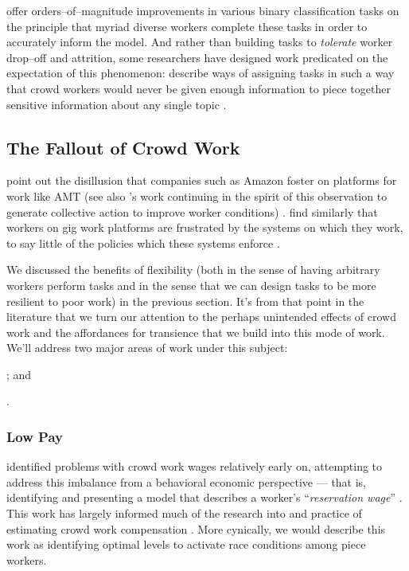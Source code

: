 \documentclass{sigchi}
\begin{document}
\citeauthor{embracingErrorKrishna} offer orders--of--magnitude improvements
in various binary classification tasks
on the principle that myriad diverse workers complete these tasks
in order to accurately inform the model.
And rather than building tasks to \textit{tolerate} worker drop--off and attrition,
some researchers have designed work predicated on the expectation of this phenomenon:
\citeauthor{sensitiveTasks} describe ways of assigning tasks in such a way that
crowd workers would never be given enough information to piece together sensitive information about
any single topic
\cite{sensitiveTasks}.



\subsection{The Fallout of Crowd Work}\label{sec:Fallout}
\citeauthor{turkopticon} point out the disillusion that companies such as Amazon foster on platforms for work like AMT
(see also \citeauthor{dynamo}'s work
continuing in the spirit of this observation to generate collective action to improve worker conditions)
\cite{turkopticon,dynamo}.
\citeauthor{uberAlgorithm}
find similarly that workers on gig work platforms are frustrated by the systems on which they work,
to say little of the policies which these systems enforce
\cite{uberAlgorithm}.

We discussed the benefits of flexibility
(both in the sense of having arbitrary workers perform tasks and
in the sense that we can design tasks to be more resilient to poor work)
in the previous section.
It's from that point in the literature that we turn our attention to
the perhaps unintended effects of crowd work
and the affordances for transience that we build into this mode of work.
We'll address two major areas of work under this subject:
\begin{inlinelist}
\item {}; and
\item {}.
\end{inlinelist}

\subsubsection{Low Pay}\label{sec:lowPay}
\citeauthor{laborEconomicsOfCrowdsourcingHorton}
identified problems with crowd work wages relatively early on,
attempting to address this imbalance from a behavioral economic perspective ---
that is, identifying and presenting a model that describes a worker's
``\textit{reservation wage}''
\cite{laborEconomicsOfCrowdsourcingHorton}.
This work has largely informed much of the research into and practice of estimating crowd work compensation
\cite{incentivesShaw,paolacci2010running}.
More cynically,
we would describe this work as identifying optimal levels to activate race conditions among piece workers.
\end{document}
